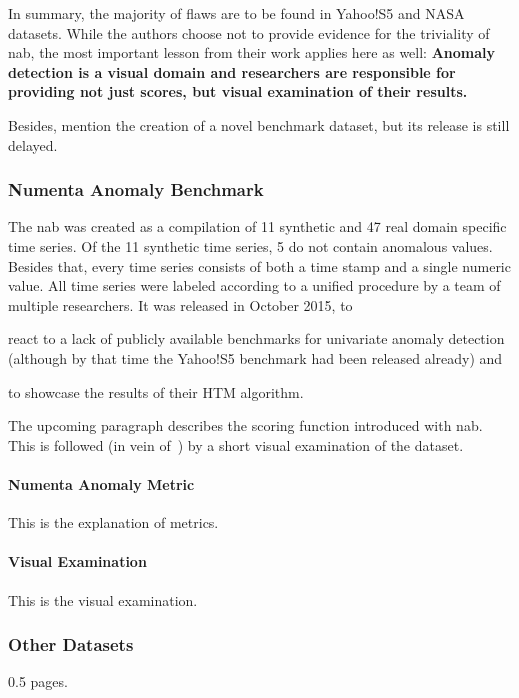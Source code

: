 In summary, the majority of flaws are to be found in Yahoo!S5 and NASA datasets.
While the authors choose not to provide evidence for the triviality of \gls{nab},
the most important lesson from their work applies here as well:
\textbf{Anomaly detection is a visual domain and researchers are responsible for
providing not just scores, but visual examination of their results.}

Besides, \textcite{Renjie.2020} mention the creation of a novel benchmark dataset,
but its release is still delayed. 



\subsubsection{Numenta Anomaly Benchmark}
The \acrfull{nab} was created as a compilation of 11 synthetic and 47 real
domain specific time series. Of the 11 synthetic time series, 5 do not contain
anomalous values. Besides that, every time series consists of both a time stamp
and a single numeric value. All time series were labeled according to a unified
procedure  by a team of multiple researchers.
It was released in October 2015, to
\begin{enumerate*}[a.)]
    \item react to a lack of publicly available benchmarks
    for univariate anomaly detection (although by that time the Yahoo!S5 benchmark
    had been released already) and 
    \item to showcase the results of their HTM algorithm.
\end{enumerate*}
The upcoming paragraph describes the scoring function introduced with \gls{nab}.
This is followed (in vein of~\cite{Renjie.2020}) by a short visual examination
of the dataset.

\paragraph{Numenta Anomaly Metric}
This is the explanation of metrics.

\paragraph{Visual Examination}
This is the visual examination.


\subsubsection{Other Datasets}
0.5 pages.



